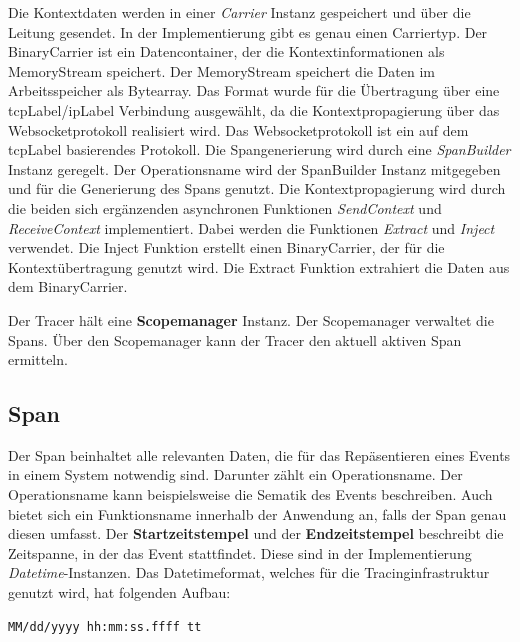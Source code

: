 Die Kontextdaten werden in einer \emph{Carrier} Instanz gespeichert und über die Leitung gesendet. In der Implementierung gibt es genau einen Carriertyp. Der BinaryCarrier ist ein Datencontainer, der die Kontextinformationen als MemoryStream speichert. Der MemoryStream speichert die Daten im Arbeitsspeicher als Bytearray. Das Format wurde für die Übertragung über eine \gls{tcpLabel}/\gls{ipLabel} Verbindung ausgewählt, da die Kontextpropagierung über das Websocketprotokoll realisiert wird. Das Websocketprotokoll ist ein auf dem \gls{tcpLabel} basierendes Protokoll.
Die Spangenerierung wird durch eine \emph{SpanBuilder} Instanz geregelt. Der Operationsname wird der SpanBuilder Instanz mitgegeben und für die Generierung des Spans genutzt. Die Kontextpropagierung wird durch die beiden sich ergänzenden asynchronen Funktionen \emph{SendContext} und \emph{ReceiveContext} implementiert. Dabei werden die Funktionen \emph{Extract} und \emph{Inject} verwendet. Die Inject Funktion erstellt einen BinaryCarrier, der für die Kontextübertragung genutzt wird. Die Extract Funktion extrahiert die Daten aus dem BinaryCarrier.

Der Tracer hält eine \textbf{Scopemanager} Instanz. Der Scopemanager verwaltet die Spans. Über den Scopemanager kann der Tracer den aktuell aktiven Span ermitteln.


\subsection{Span}
\label{subsection:Span}
Der Span beinhaltet alle relevanten Daten, die für das Repäsentieren eines Events in einem System notwendig sind. Darunter zählt ein Operationsname. Der Operationsname kann beispielsweise die Sematik des Events beschreiben. Auch bietet sich ein Funktionsname innerhalb der Anwendung an, falls der Span genau diesen umfasst. Der \textbf{Startzeitstempel} und der \textbf{Endzeitstempel} beschreibt die Zeitspanne, in der das Event stattfindet. Diese sind in der Implementierung \emph{Datetime}-Instanzen. Das Datetimeformat, welches für die Tracinginfrastruktur genutzt wird, hat folgenden Aufbau:

\begin{minipage}[]{\textwidth}
	\begin{lstlisting}[frame=trBL]
	MM/dd/yyyy hh:mm:ss.ffff tt
	\end{lstlisting}
	\label{listing:Tracer Verbindungsaufbau}
\end{minipage} 

